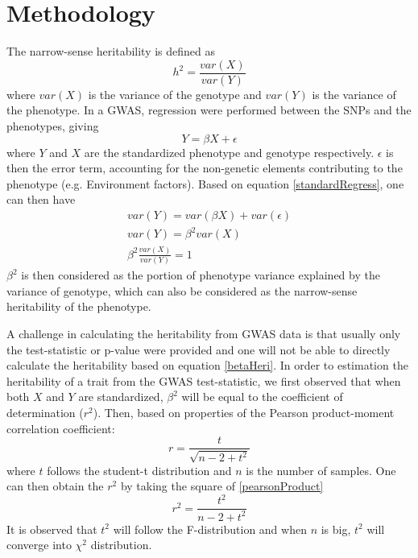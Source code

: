 \documentclass{book}
\begin{document}
	\section{Methodology}
		The narrow-sense heritability is defined as 
		$$
			h^2 = \frac{var(X)}{var(Y)}
		$$
		where $var(X)$ is the variance of the genotype and $var(Y)$ is the variance of the phenotype.
		In a \acrfull{GWAS}, regression were performed between the \acrshort{SNP}s and the phenotypes, giving
		\begin{equation}
			Y=\beta X+\epsilon
			\label{standardRegress}
		\end{equation}
		where $Y$ and $X$ are the standardized phenotype and genotype respectively. 
		$\epsilon$ is then the error term, accounting for the non-genetic elements contributing to the phenotype (e.g. Environment factors).
		Based on equation \ref{standardRegress}, one can then have
		\begin{align}
			var(Y) = var(\beta X)+ var(\epsilon) \nonumber\\
			var(Y) = \beta^2var(X) \nonumber\\
			\beta^2\frac{var(X)}{var(Y)}= 1
			\label{betaHeri}
		\end{align}
		$\beta^2$ is then considered as the portion of phenotype variance explained by the variance of genotype, which can also be considered as the narrow-sense heritability of the phenotype.
				
		A challenge in calculating the heritability from \acrshort{GWAS} data is that usually only the test-statistic or p-value were provided and one will not be able to directly calculate the heritability based on equation \ref{betaHeri}. In order to estimation the heritability of a trait from the \acrshort{GWAS} test-statistic, we first observed that when both $X$ and $Y$ are standardized, $\beta^2$ will be equal to the coefficient of determination ($r^2$). Then, based on properties of the Pearson product-moment correlation coefficient:
		\begin{equation}
			r = \frac{t}{\sqrt{n-2+t^2}}
			\label{pearsonProduct}
		\end{equation}
		where $t$ follows the student-t distribution and $n$ is the number of samples.
		One can then obtain the $r^2$ by taking the square of \ref{pearsonProduct}
		\begin{equation}
			r^2 = \frac{t^2}{n-2+t^2}
			\label{oriRSquared}
		\end{equation}
		It is observed that $t^2$ will follow the F-distribution and when $n$ is big, $t^2$ will converge into $\chi^2$ distribution.
		
\end{document}
